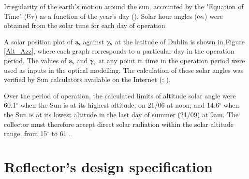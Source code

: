 Irregularity of the earth's motion around the sun, accounted by the "Equation of Time" ($\rm{E_T}$) as a function of the year's day (\cite{Goswami2015}). Solar hour angles ($\omega_{\rm{s}}$) were obtained from the solar time for each day of operation. 

%
%

A solar position plot of ${\rm a_s}$ against $\gamma_{\rm{s}}$ at the latitude of Dublin is shown in Figure \ref{Alt_Azz}, where each graph corresponds to a particular day in the operation period. The values of ${\rm a_s}$ and $\gamma_{\rm{s}}$ at any point in time in the operation period were used as inputs in the optical modelling. The calculation of these solar angles was verified by Sun calculators available on the Internet (\cite{Time2018}; \cite{SunCalc2018}).


Over the period of operation, the calculated limits of altitude solar angle were 60.1$^{\circ}$ when the Sun is at its highest altitude, on 21/06 at noon; and 14.6$^{\circ}$ when the Sun is at its lowest altitude in the last day of summer (21/09) at 9am. The collector must therefore accept direct solar radiation within the solar altitude range, from 15$^{\circ}$ to 61$^{\circ}$.

\section{Reflector's design specification}


